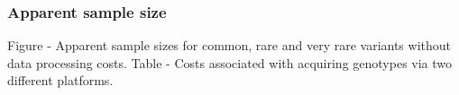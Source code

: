 






\subsubsection{Apparent sample size}

Figure - Apparent sample sizes for common, rare and very rare variants without data processing costs. 
Table - Costs associated with acquiring genotypes via two different platforms.